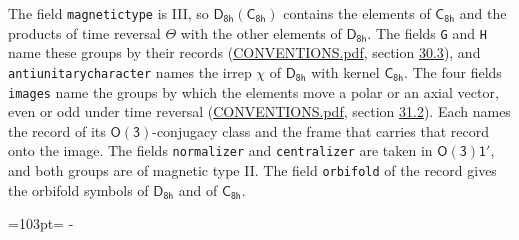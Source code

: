 \documentclass[10pt,a4paper]{article}
\newcommand{\needspace}[1]{\par\penalty-100\begingroup\dimen0=#1\relax\dimen2=\pagegoal
  \advance\dimen2-\pagetotal\ifdim\dimen0>\dimen2\relax\ifdim\dimen2>0pt\vfil\break\fi\fi
  \endgroup}
\numberwithin{equation}{section}
\newcommand{\grp}[1]{\mathsf{#1}}
\begin{document}
The field \texttt{magnetictype} is III, so $\grp{D_{8h}}(\grp{C_{8h}})$ contains the elements of $\grp{C_{8h}}$ and the products of time reversal $\varTheta$ with the other elements of $\grp{D_{8h}}$. The fields \texttt{G} and \texttt{H} name these groups by their records (\href{../../CONVENTIONS.pdf}{CONVENTIONS.pdf}, section \href{../../CONVENTIONS.pdf\#conv.30.3}{30.3}), and \texttt{antiunitarycharacter} names the irrep $\chi$ of $\grp{D_{8h}}$ with kernel $\grp{C_{8h}}$. The four fields \texttt{images} name the groups by which the elements move a polar or an axial vector, even or odd under time reversal (\href{../../CONVENTIONS.pdf}{CONVENTIONS.pdf}, section \href{../../CONVENTIONS.pdf\#conv.31.2}{31.2}). Each names the record of its $\grp{O(3)}$-conjugacy class and the frame that carries that record onto the image. The fields \texttt{normalizer} and \texttt{centralizer} are taken in $\grp{O(3)1'}$, and both groups are of magnetic type II. The field \texttt{orbifold} of the record gives the orbifold symbols of $\grp{D_{8h}}$ and of $\grp{C_{8h}}$.
\needspace{103pt}
\end{document}
